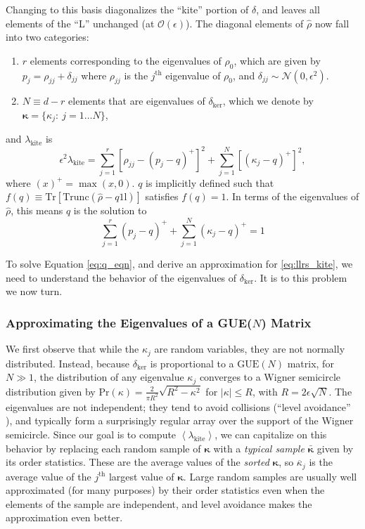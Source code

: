 \documentclass[aps,pra, twocolumn]{revtex4-1}
\newcommand{\Tr}{\mathrm{Tr}}
\newcommand{\Id}{\mathbb{I}}
\newcommand{\expect}[1]{\ensuremath{\left\langle#1\right\rangle}}
\def\Id{1\!\mathrm{l}}
\newcommand{\bvec}[1]{\boldsymbol{#1}}
\newcommand{\rhohat}{\hat{\rho}}
\begin{document}
Changing to this basis diagonalizes the ``kite'' portion of $\delta$, and leaves all elements of the ``L'' unchanged (at $\mathcal{O}(\epsilon)$).  The diagonal elements of $\hat\rho$ now fall into two categories:
\begin{enumerate}[noitemsep]
\item $r$ elements corresponding to the eigenvalues of $\rho_0$, which are given by $p_{j} = \rho_{jj} + \delta_{jj}$ where  $\rho_{jj}$ is the $j^{\mathrm{th}}$ eigenvalue of $\rho_{0}$, and $\delta_{jj} \sim \mathcal{N}(0,\epsilon^2)$.
\item $N \equiv d-r$ elements that are eigenvalues of $\delta_{\mathrm{ker}}$, which we denote by $\bvec{\kappa} = \{\kappa_j:~j = 1\ldots 
N\}$,
\end{enumerate}
and $\lambda_{\mathrm{kite}}$ is
\begin{equation}
\label{eq:llrs_kite}
\epsilon^{2}\lambda_{\mathrm{kite}} = \sum_{j=1}^{r}[\rho_{jj}- (p_j-q)^{+}]^2 + \sum_{j=1}^{N}\left[(\kappa_j-q)^+\right]^2,
\end{equation}
where $(x)^{+} = \max(x, 0)$. $q$ is implicitly defined such that $f(q) \equiv \Tr\left[\mathrm{Trunc}(\hat\rho - q \Id)\right]$ satisfies $f(q) = 1$. In terms of the eigenvalues of $\rhohat$, this means $q$ is the solution to
\begin{equation}
\label{eq:q_eqn}
 \sum_{j=1}^{r}(p_j - q)^{+} + \sum_{j=1}^{N}{(\kappa_j-q)^+} = 1
\end{equation}

To solve Equation \eqref{eq:q_eqn}, and derive an approximation for \eqref{eq:llrs_kite}, we need to understand the behavior of the eigenvalues of $\delta_{\mathrm{ker}}$. It is to this problem we now turn.

\subsubsection{Approximating the Eigenvalues of a GUE($N$) Matrix}
We first observe that while the $\kappa_j$ are random variables, they are not normally distributed.  Instead, because $\delta_{\mathrm{ker}}$ is proportional to a $\mathrm{GUE}(N)$ matrix, for $N\gg1$, the distribution of any eigenvalue $\kappa_{j}$
converges to a Wigner semicircle distribution \cite{Wigner1958} given by $\mathrm{Pr}(\kappa) = \frac{2}{\pi R^{2}}\sqrt{R^{2}-\kappa^{2}}$ for $|\kappa| \leq R$, with $R = 2\epsilon\sqrt{N}$.  The eigenvalues are not independent; they tend to avoid collisions (``level avoidance'' \cite{Tao2013}), 
and typically form a surprisingly regular array over the support of the Wigner semicircle.  Since our goal is to compute $\expect{\lambda_{\mathrm{kite}}}$, we can capitalize on this behavior by replacing each random sample of $\bvec{\kappa}$ with a 
\emph{typical sample} $\bar{\bvec{\kappa}}$ given by its order statistics.  These are the average values of the \emph{sorted} 
$\bvec{\kappa}$, so $\overline{\kappa}_j$ is the average value of the $j^{\mathrm{th}}$ largest value of $\bvec{\kappa}$.  Large random samples 
are usually well approximated (for many purposes) by their order statistics even when the elements of the sample are 
independent, and level avoidance makes the approximation even better. 
\end{document}
